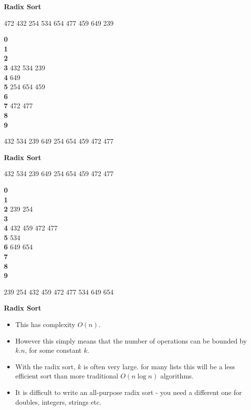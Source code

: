 \documentclass[a4,portraitt]{slides}
\begin{document}
\newpage
{\samepage
\begin{center}
{\Large{\bf Radix Sort}}
\end{center}

472 432 254 534 654 477 459 649 239

{\bf 0}\\
{\bf 1}\\
{\bf 2}\\
{\bf 3} 432 534 239\\
{\bf 4} 649\\
{\bf 5} 254 654 459\\
{\bf 6}\\
{\bf 7} 472 477\\
{\bf 8}\\
{\bf 9}
}

432 534 239 649 254 654 459 472 477

\newpage
{\samepage
\begin{center}
{\Large{\bf Radix Sort}}
\end{center}

432 534 239 649 254 654 459 472 477

{\bf 0}\\
{\bf 1}\\
{\bf 2} 239 254\\
{\bf 3}\\
{\bf 4} 432 459 472 477\\
{\bf 5} 534\\
{\bf 6} 649 654\\
{\bf 7}\\
{\bf 8}\\
{\bf 9}

239 254 432 459 472 477 534 649 654
}

\newpage
{\samepage
\begin{center}
{\Large{\bf Radix Sort}}
\end{center}
\begin{itemize}
\item This has complexity $O(n)$.
\item However this simply means that the number of operations
can be bounded by $k.n$, for some constant $k$.
\item With the radix sort, $k$
is often very large. for many lists this will be a less efficient
sort than more traditional $O(n \log n)$ algorithms.
\item It is difficult to write an all-purpose radix sort - you need
a different one for doubles, integers, strings etc.
\end{itemize}
}
\end{document}
